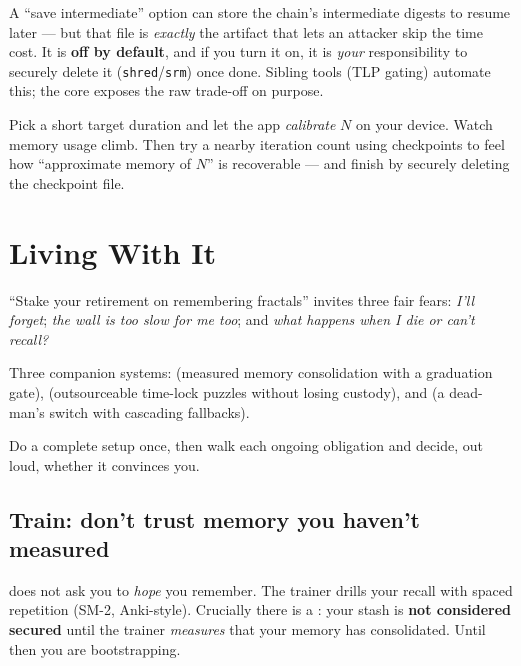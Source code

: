 \documentclass[a4paper,11pt]{report}
\newcommand{\probsoln}[3]{%
  \begin{description}[leftmargin=0pt,labelsep=0.5em,style=nextline]
    \item[\textcolor{attackcol}{Problem.}] #1
    \item[\textcolor{accent}{Solution.}] #2
    \item[\textcolor{modelcol}{Methodology.}] #3
  \end{description}}
\begin{document}
\begin{pitfall}
A ``save intermediate'' option can store the chain's intermediate digests to
resume later — but that file is \emph{exactly} the artifact that lets an attacker
skip the time cost. It is \textbf{off by default}, and if you turn it on, it is
\emph{your} responsibility to securely delete it (\texttt{shred}/\texttt{srm})
once done. Sibling tools (TLP gating) automate this; the core exposes the raw
trade-off on purpose.
\end{pitfall}

\begin{tryit}[In session]
Pick a short target duration and let the app \emph{calibrate} $N$ on your device.
Watch memory usage climb. Then try a nearby iteration count using checkpoints to
feel how ``approximate memory of $N$'' is recoverable — and finish by securely
deleting the checkpoint file.
\end{tryit}

\chapter{Living With It}

\probsoln
{``Stake your retirement on remembering fractals'' invites three fair fears:
\emph{I'll forget}; \emph{the wall is too slow for me too}; and \emph{what
happens when I die or can't recall?}}
{Three companion systems: \term{Train} (measured memory consolidation with a
graduation gate), \term{Accelerate} (outsourceable time-lock puzzles without
losing custody), and \term{Inherit} (a dead-man's switch with cascading
fallbacks).}
{Do a complete setup once, then walk each ongoing obligation and decide, out
loud, whether it convinces you.}

\section{Train: don't trust memory you haven't measured}
\GW{} does not ask you to \emph{hope} you remember. The
 trainer drills your recall with spaced
repetition (SM-2, Anki-style). Crucially there is a : your
stash is \textbf{not considered secured} until the trainer \emph{measures} that
your memory has consolidated. Until then you are bootstrapping.
\end{document}

